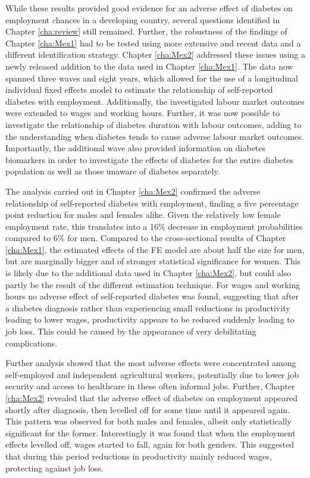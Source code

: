 While these results provided good evidence for an adverse effect of diabetes on employment chances in a developing country, several questions identified in Chapter \ref{cha:review} still remained. Further, the robustness of the findings of Chapter \ref{cha:Mex1} had to be tested using more extensive and recent data and a different identification strategy. Chapter \ref{cha:Mex2} addressed these issues using a newly released addition to the data used in Chapter \ref{cha:Mex1}. The data now spanned three waves and eight years, which allowed for the use of a longitudinal individual fixed effects model to estimate the relationship of self-reported diabetes with employment. Additionally, the investigated labour market outcomes were extended to wages and working hours. Further, it was now possible to investigate the relationship of diabetes duration with labour outcomes, adding to the understanding when diabetes tends to cause adverse labour market outcomes. Importantly, the additional wave also provided information on diabetes biomarkers in order to investigate the effects of diabetes for the entire diabetes population as well as those unaware of diabetes separately.

The analysis carried out in Chapter \ref{cha:Mex2} confirmed the adverse relationship of self-reported diabetes with employment, finding a five percentage point reduction for males and females alike. Given the relatively low female employment rate, this translates into a 16\% decrease in employment probabilities compared to 6\% for men. Compared to the cross-sectional results of Chapter \ref{cha:Mex1}, the estimated effects of the \ac{FE} model are about half the size for men, but are marginally bigger and of stronger statistical significance for women. This is likely due to the additional data used in Chapter \ref{cha:Mex2}, but could also partly be the result of the different estimation technique. For wages and working hours no adverse effect of self-reported diabetes was found, suggesting that after a diabetes diagnosis rather than experiencing small reductions in productivity leading to lower wages, productivity appears to be reduced suddenly leading to job loss. This could be caused by the appearance of very debilitating complications. 

Further analysis showed that the most adverse effects were concentrated among self-employed and independent agricultural workers, potentially due to lower job security and access to healthcare in these often informal jobs. Further, Chapter \ref{cha:Mex2} revealed that the adverse effect of diabetes on employment appeared shortly after diagnosis, then levelled off for some time until it appeared again. This pattern was observed for both males and females, albeit only statistically significant for the former. Interestingly it was found that when the employment effects levelled off, wages started to fall, again for both genders. This suggested that during this period reductions in productivity mainly reduced wages, protecting against job loss.

